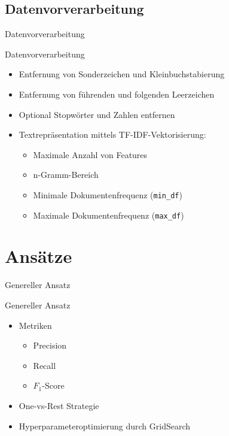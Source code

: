 \documentclass[aspectratio=169]{beamer} %
\begin{document}
\subsection{Datenvorverarbeitung}

\begin{frame}{Datenvorverarbeitung}
    \begin{block}{Datenvorverarbeitung}
        \begin{itemize}
            \item Entfernung von Sonderzeichen und Kleinbuchstabierung

            \item Entfernung von f\"uhrenden und folgenden Leerzeichen

            \item Optional Stopw\"orter und Zahlen entfernen

            \item Textrepr\"asentation mittels TF-IDF-Vektorisierung:
                  \begin{itemize}
                      \item Maximale Anzahl von Features
                      \item n-Gramm-Bereich
                      \item Minimale Dokumentenfrequenz (\texttt{min\_df})
                      \item Maximale Dokumentenfrequenz (\texttt{max\_df})
                  \end{itemize}
        \end{itemize}
    \end{block}
\end{frame}

\section{Ans\"atze}

\begin{frame}{Genereller Ansatz}
    \begin{block}{Genereller Ansatz}
        \begin{itemize}
            \item Metriken
            \begin{itemize}
                \item Precision

                \item Recall
    
                \item $F_1$-Score
            \end{itemize}

            \item One-vs-Rest Strategie

            \item Hyperparameteroptimierung durch GridSearch
        \end{itemize}
    \end{block}
\end{frame}
\end{document}
